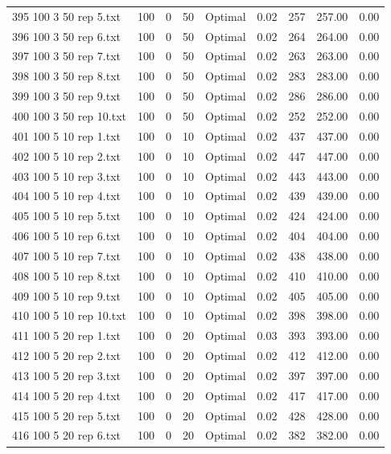 \begin{longtable}{lrrllrrrr}
395 100 3 50 rep 5.txt & 100 & 0 & 50 & Optimal &  0.02 & 257 & 257.00 &  0.00\\
396 100 3 50 rep 6.txt & 100 & 0 & 50 & Optimal &  0.02 & 264 & 264.00 &  0.00\\
397 100 3 50 rep 7.txt & 100 & 0 & 50 & Optimal &  0.02 & 263 & 263.00 &  0.00\\
398 100 3 50 rep 8.txt & 100 & 0 & 50 & Optimal &  0.02 & 283 & 283.00 &  0.00\\
399 100 3 50 rep 9.txt & 100 & 0 & 50 & Optimal &  0.02 & 286 & 286.00 &  0.00\\
400 100 3 50 rep 10.txt & 100 & 0 & 50 & Optimal &  0.02 & 252 & 252.00 &  0.00\\
401 100 5 10 rep 1.txt & 100 & 0 & 10 & Optimal &  0.02 & 437 & 437.00 &  0.00\\
402 100 5 10 rep 2.txt & 100 & 0 & 10 & Optimal &  0.02 & 447 & 447.00 &  0.00\\
403 100 5 10 rep 3.txt & 100 & 0 & 10 & Optimal &  0.02 & 443 & 443.00 &  0.00\\
404 100 5 10 rep 4.txt & 100 & 0 & 10 & Optimal &  0.02 & 439 & 439.00 &  0.00\\
405 100 5 10 rep 5.txt & 100 & 0 & 10 & Optimal &  0.02 & 424 & 424.00 &  0.00\\
406 100 5 10 rep 6.txt & 100 & 0 & 10 & Optimal &  0.02 & 404 & 404.00 &  0.00\\
407 100 5 10 rep 7.txt & 100 & 0 & 10 & Optimal &  0.02 & 438 & 438.00 &  0.00\\
408 100 5 10 rep 8.txt & 100 & 0 & 10 & Optimal &  0.02 & 410 & 410.00 &  0.00\\
409 100 5 10 rep 9.txt & 100 & 0 & 10 & Optimal &  0.02 & 405 & 405.00 &  0.00\\
410 100 5 10 rep 10.txt & 100 & 0 & 10 & Optimal &  0.02 & 398 & 398.00 &  0.00\\
411 100 5 20 rep 1.txt & 100 & 0 & 20 & Optimal &  0.03 & 393 & 393.00 &  0.00\\
412 100 5 20 rep 2.txt & 100 & 0 & 20 & Optimal &  0.02 & 412 & 412.00 &  0.00\\
413 100 5 20 rep 3.txt & 100 & 0 & 20 & Optimal &  0.02 & 397 & 397.00 &  0.00\\
414 100 5 20 rep 4.txt & 100 & 0 & 20 & Optimal &  0.02 & 417 & 417.00 &  0.00\\
415 100 5 20 rep 5.txt & 100 & 0 & 20 & Optimal &  0.02 & 428 & 428.00 &  0.00\\
416 100 5 20 rep 6.txt & 100 & 0 & 20 & Optimal &  0.02 & 382 & 382.00 &  0.00\\

\end{longtable}
